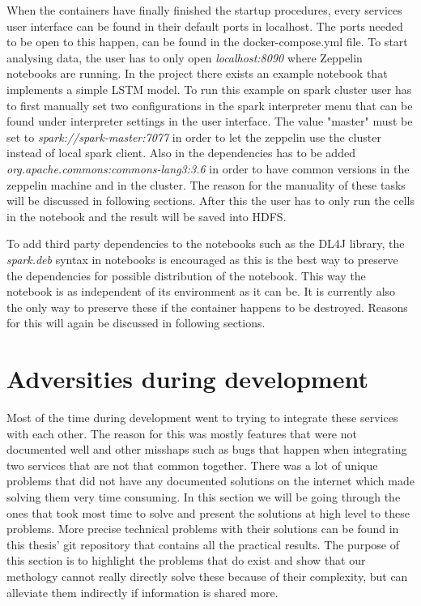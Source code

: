 When the containers have finally finished the startup procedures, every services user interface can be found in their default ports in localhost.
The ports needed to be open to this happen, can be found in the docker-compose.yml file.
To start analysing data, the user has to only open \emph{localhost:8090} where Zeppelin notebooks are running.
In the project there exists an example notebook that implements a simple LSTM model.
To run this example on spark cluster user has to first manually set two configurations in the spark interpreter menu that can be found under interpreter settings in the user interface.
The value "master" must be set to \emph{spark://spark-master:7077} in order to let the zeppelin use the cluster instead of local spark client.
Also in the dependencies has to be added \emph{org.apache.commons:commons-lang3:3.6} in order to have common versions in the zeppelin machine and in the cluster.
The reason for the manuality of these tasks will be discussed in following sections.
After this the user has to only run the cells in the notebook and the result will be saved into HDFS.

To add third party dependencies to the notebooks such as the DL4J library, the \emph{spark.deb} syntax in notebooks is encouraged as this is the best way to preserve the dependencies for possible distribution of the notebook.
This way the notebook is as independent of its environment as it can be.
It is currently also the only way to preserve these if the container happens to be destroyed. 
Reasons for this will again be discussed in following sections.

\section{Adversities during development}

Most of the time during development went to trying to integrate these services with each other.
The reason for this was mostly features that were not documented well and other misshaps such as bugs that happen when integrating two services that are not that common together.
There was a lot of unique problems that did not have any documented solutions on the internet which made solving them very time consuming.
In this section we will be going through the ones that took most time to solve and present the solutions at high level to these problems.
More precise technical problems with their solutions can be found in this thesis' git repository that contains all the practical results.
The purpose of this section is to highlight the problems that do exist and show that our methology cannot really directly solve these because of their complexity, but can alleviate them indirectly if information is shared more.

